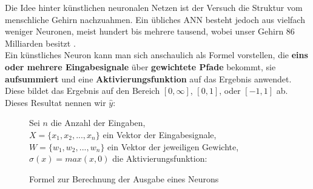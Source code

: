             Die Idee hinter künstlichen neuronalen Netzen ist der Versuch die Struktur vom menschliche Gehirn nachzuahmen. Ein übliches ANN besteht jedoch aus vielfach weniger Neuronen, meist hundert bis mehrere tausend, wobei unser Gehirn 86 Milliarden besitzt \cite{brainsize}.\\
            \noindent
            Ein künstliches Neuron kann man sich anschaulich als Formel vorstellen, die \textbf{eins oder mehrere Eingabesignale} über \textbf{gewichtete Pfade} bekommt, sie \textbf{aufsummiert} und eine \textbf{Aktivierungsfunktion} auf das Ergebnis anwendet. Diese bildet das Ergebnis auf den Bereich $[0,\infty]$, $[0,1]$, oder $[-1,1]$ ab. Dieses Resultat nennen wir $\hat{y}$:
            \hfill \\
            \begin{figure}[H]
                \begin{mdframed}
                    \noindent
                    Sei $n$ die Anzahl der Eingaben,\\
                    \hspace*{4.5mm}    $X = \{x_1,x_2,...,x_n\}$ ein Vektor der Eingabesignale,\\
                    \hspace*{4.5mm}    $W = \{w_1,w_2,...,w_n\}$ ein Vektor der jeweiligen Gewichte, \\
                    \hspace*{4.5mm}    $\sigma(x) = max(x,0)$ die Aktivierungsfunktion:\\[4mm]
                    \hspace*{50mm} 
                \end{mdframed}
                \formforfigure
                \caption{\label{neuron-math} Formel zur Berechnung der Ausgabe eines Neurons}
            \end{figure}

